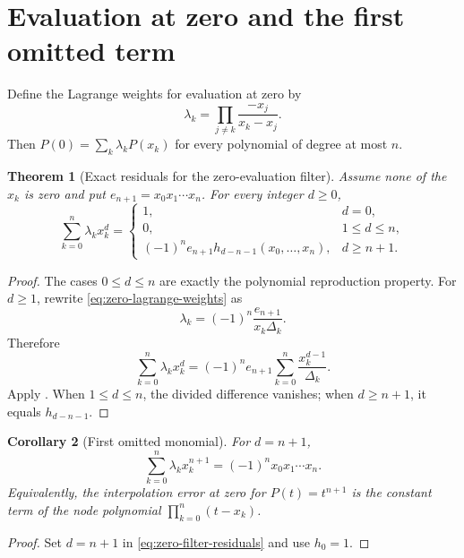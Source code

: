 \documentclass[11pt,oneside,openany]{book}
\newtheorem{theorem}{Theorem}[chapter]
\newtheorem{corollary}[theorem]{Corollary}
\theoremstyle{definition}
\theoremstyle{remark}
\begin{document}
\section{Evaluation at zero and the first omitted term}

Define the Lagrange weights for evaluation at zero by
\begin{equation}
 \lambda_k=\prod_{j\ne k}\frac{-x_j}{x_k-x_j}.\label{eq:zero-lagrange-weights}
\end{equation}
Then $P(0)=\sum_k\lambda_kP(x_k)$ for every polynomial of degree at most $n$.

\begin{theorem}[Exact residuals for the zero-evaluation filter]\label{thm:zero-filter-residuals}
Assume none of the $x_k$ is zero and put $e_{n+1}=x_0x_1\cdots x_n$.  For every integer $d\ge0$,
\begin{equation}
 \sum_{k=0}^n\lambda_kx_k^d=
 \begin{cases}
 1,&d=0,\\
 0,&1\le d\le n,\\
 (-1)^ne_{n+1}h_{d-n-1}(x_0,\ldots,x_n),&d\ge n+1.
 \end{cases}\label{eq:zero-filter-residuals}
\end{equation}
\end{theorem}

\begin{proof}
The cases $0\le d\le n$ are exactly the polynomial reproduction property.  For $d\ge1$, rewrite \eqref{eq:zero-lagrange-weights} as
\[
 \lambda_k=(-1)^n\frac{e_{n+1}}{x_k\Delta_k}.
\]
Therefore
\[
 \sum_{k=0}^n\lambda_kx_k^d
 =(-1)^ne_{n+1}\sum_{k=0}^n\frac{x_k^{d-1}}{\Delta_k}.
\]
Apply .  When $1\le d\le n$, the divided difference vanishes; when $d\ge n+1$, it equals $h_{d-n-1}$.
\end{proof}

\begin{corollary}[First omitted monomial]\label{cor:first-omitted-monomial}
For $d=n+1$,
\begin{equation}
 \sum_{k=0}^n\lambda_kx_k^{n+1}=(-1)^nx_0x_1\cdots x_n.\label{eq:first-omitted-monomial}
\end{equation}
Equivalently, the interpolation error at zero for $P(t)=t^{n+1}$ is the constant term of the node polynomial $\prod_{k=0}^n(t-x_k)$.
\end{corollary}

\begin{proof}
Set $d=n+1$ in \eqref{eq:zero-filter-residuals} and use $h_0=1$.
\end{proof}
\end{document}
